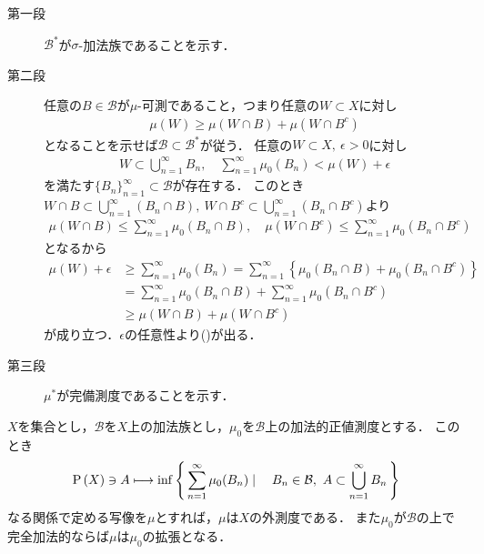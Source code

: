 		\begin{prf}\mbox{}
			\begin{description}
				\item[第一段]
					$\mathcal{B}^*$が$\sigma$-加法族であることを示す．
				
				\item[第二段]
					任意の$B \in \mathcal{B}$が$\mu$-可測であること，つまり任意の$W \subset X$に対し
					\begin{align}
						\mu(W) \geq \mu(W \cap B) + \mu(W \cap B^c)
						\label{eq:thm_Caratheodory_extension_theorem}
					\end{align}
					となることを示せば$\mathcal{B} \subset \mathcal{B}^*$が従う．
					任意の$W \subset X,\ \epsilon > 0$に対し
					\begin{align}
						W \subset \bigcup_{n=1}^\infty B_n,
						\quad \sum_{n=1}^\infty \mu_0(B_n) < \mu(W) + \epsilon
					\end{align}
					を満たす$\{B_n\}_{n=1}^\infty \subset \mathcal{B}$が存在する．
					このとき$W \cap B \subset \bigcup_{n=1}^\infty (B_n \cap B)
					,\ W \cap B^c \subset \bigcup_{n=1}^\infty (B_n \cap B^c)$より
					\begin{align}
						\mu(W \cap B) \leq \sum_{n=1}^\infty \mu_0(B_n \cap B),
						\quad \mu(W \cap B^c) \leq \sum_{n=1}^\infty \mu_0(B_n \cap B^c)
					\end{align}
					となるから
					\begin{align}
						\mu(W) + \epsilon
						&\geq \sum_{n=1}^\infty \mu_0(B_n)
						= \sum_{n=1}^\infty \left\{ \mu_0(B_n \cap B) + \mu_0(B_n \cap B^c) \right\} \\
						&= \sum_{n=1}^\infty \mu_0(B_n \cap B) + \sum_{n=1}^\infty \mu_0(B_n \cap B^c) \\
						&\geq \mu(W \cap B) + \mu(W \cap B^c)
					\end{align}
					が成り立つ．$\epsilon$の任意性より()が出る．
					
				\item[第三段]
					$\mu^*$が完備測度であることを示す．
					\QED
			\end{description}
		\end{prf}
		
		\begin{screen}
			\begin{thm}[有限加法的な正値測度により定まる外測度]\label{thm:outer_measure_finitely_additive_measure}
				$X$を集合とし，$\mathcal{B}$を$X$上の加法族とし，$\mu_0$を$\mathcal{B}$上の加法的正値測度とする．
				このとき
				\begin{align}
					\operatorname*{P} \left(X\right) \ni A \longmapsto \operatorname*{inf}_{} \left\{\, \sum_{n=1}^\infty \mu_0(B_n) \mid \quad B_n \in \mathcal{B},\ A \subset \bigcup_{n=1}^\infty B_n\, \right\}
				\end{align}
				なる関係で定める写像を$\mu$とすれば，$\mu$は$X$の外測度である．
				また$\mu_0$が$\mathcal{B}$の上で完全加法的ならば$\mu$は$\mu_0$の拡張となる．
			\end{thm}
		\end{screen}
		
